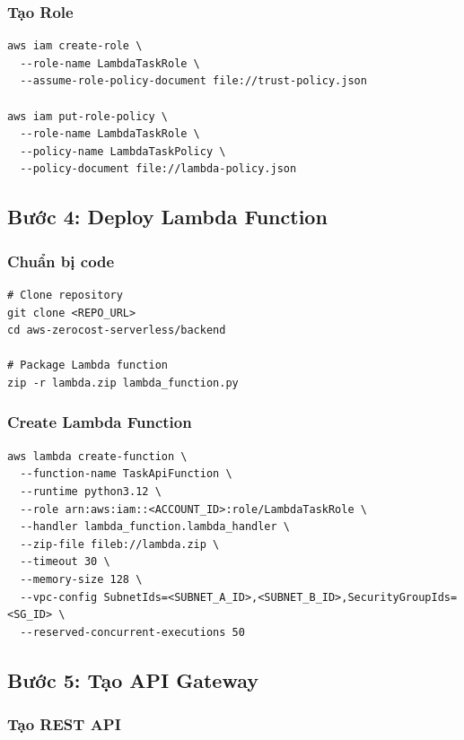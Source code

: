 \subsubsection{Tạo Role}

\begin{verbatim}
aws iam create-role \
  --role-name LambdaTaskRole \
  --assume-role-policy-document file://trust-policy.json

aws iam put-role-policy \
  --role-name LambdaTaskRole \
  --policy-name LambdaTaskPolicy \
  --policy-document file://lambda-policy.json
\end{verbatim}

\subsection{Bước 4: Deploy Lambda Function}
\label{ssec:deploy_lambda}

\subsubsection{Chuẩn bị code}

\begin{verbatim}
# Clone repository
git clone <REPO_URL>
cd aws-zerocost-serverless/backend

# Package Lambda function
zip -r lambda.zip lambda_function.py
\end{verbatim}

\subsubsection{Create Lambda Function}

\begin{verbatim}
aws lambda create-function \
  --function-name TaskApiFunction \
  --runtime python3.12 \
  --role arn:aws:iam::<ACCOUNT_ID>:role/LambdaTaskRole \
  --handler lambda_function.lambda_handler \
  --zip-file fileb://lambda.zip \
  --timeout 30 \
  --memory-size 128 \
  --vpc-config SubnetIds=<SUBNET_A_ID>,<SUBNET_B_ID>,SecurityGroupIds=<SG_ID> \
  --reserved-concurrent-executions 50
\end{verbatim}

\subsection{Bước 5: Tạo API Gateway}
\label{ssec:deploy_apigw}

\subsubsection{Tạo REST API}

